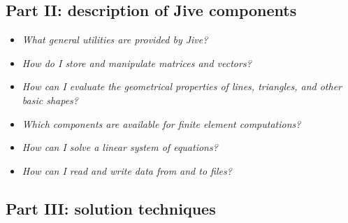 \documentclass[a4paper,12pt]{article}
\begin{document}
\subsection*{Part II: description of Jive components}

\begin{itemize}

\item \emph{What general utilities are provided by Jive?}

\item \emph{How do I store and manipulate matrices and vectors?}
    
\item \emph{How can I evaluate the geometrical properties of lines,
    triangles, and other basic shapes?}

\item \emph{Which components are available for finite element
    computations?}

\item \emph{How can I solve a linear system of equations?}

\item \emph{How can I read and write data from and to files?}

\end{itemize}


\subsection*{Part III: solution techniques}
\end{document}
